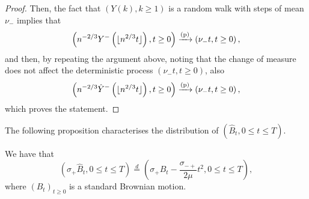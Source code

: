 \begin{proof}
 Then, the fact that $(Y(k),k\geq 1)$ is a random walk with steps of mean $\nu_-$ implies that
 $$\left(n^{-2/3}Y^-\left(\lfloor n^{2/3}t\rfloor\right),t\geq 0\right)\xrightarrow[]{\mathrm{(p)}}\left(\nu_- t,t\geq 0\right),$$
 and then, by repeating the argument above, noting that the change of measure does not affect the deterministic process $(\nu_- t,t\geq 0)$, also 
 $$\left(n^{-2/3}\hat{Y}^-\left(\lfloor n^{2/3}t\rfloor\right),t\geq 0\right)\xrightarrow[]{\mathrm{(p)}}\left(\nu_- t,t\geq 0\right),$$
 which proves the statement.
 \end{proof}
 The following proposition characterises the distribution of $(\hat{B}_t, {0\leq t\leq T})$.
 \begin{proposition}
 \label{prop:characterizelimitprocess}
 We have that
 $$(\sigma_+ \hat{B}_t, {0\leq t\leq T})\overset{d}{=}\left(\sigma_+ B_t-\frac{\sigma_{-+}}{2\mu}t^2, {0\leq t\leq T}\right),$$
 where $(B_t)_{t\geq 0}$ is a standard Brownian motion.
 \end{proposition}
